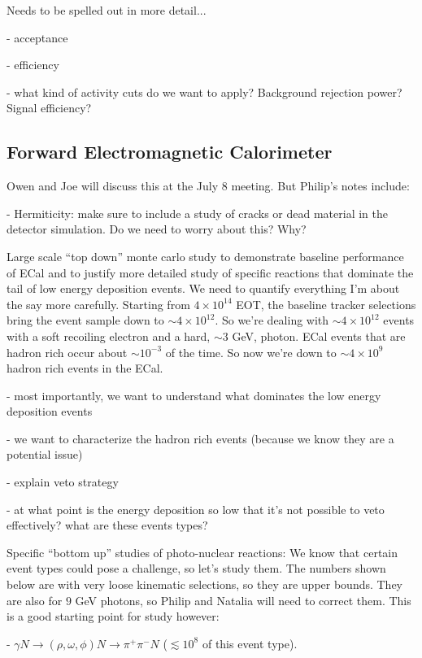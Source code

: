 Needs to be spelled out in more detail...

- acceptance

- efficiency 

- what kind of activity cuts do we want to apply?  Background rejection power?  Signal efficiency? 


\subsection{Forward Electromagnetic Calorimeter}

Owen and Joe will discuss this at the July 8 meeting. But Philip's notes include: 

- Hermiticity:  make sure to include a study of cracks or dead material in the detector simulation. Do we need to worry about this? Why? 

Large scale ``top down'' monte carlo study to demonstrate baseline performance of ECal and to justify more detailed study of specific reactions that dominate the tail of low energy deposition events. We need to quantify everything I'm about the say more carefully. Starting from $4\times 10^{14}$ EOT, the baseline tracker selections bring the event sample down to $\sim 4 \times 10^{12}$. So we're dealing with $\sim 4 \times 10^{12}$ events with a soft recoiling electron and a hard, $\sim 3$ GeV, photon. ECal events that are hadron rich occur about $\sim10^{-3}$ of the time. So now we're down to $\sim 4\times 10^{9}$ hadron rich events in the ECal. 

- most importantly, we want to understand what dominates the low energy deposition events

- we want to characterize the hadron rich events (because we know they are a potential issue)

- explain veto strategy

- at what point is the energy deposition so low that it's not possible to veto effectively? what are these events types? 

Specific ``bottom up'' studies of photo-nuclear reactions:  We know that certain event types could pose a challenge, so let's study them. The numbers shown below are with very loose kinematic selections, so they are upper bounds. They are also for $9$ GeV photons, so Philip and Natalia will need to correct them. This is a good starting point for study however: 

- $\gamma N \rightarrow (\rho,\omega,\phi)N\rightarrow \pi^+\pi^- N$ ($\lesssim 10^8$ of this event type). 

